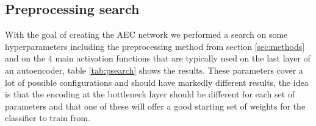     \subsection{Preprocessing search} \label{sec:psearc}

      With the goal of creating the AEC network we performed a search on some hyperparameters
      including the preprocessing method from section \ref{sec:methods} and on the 4 main activation functions
      that are typically used on the last layer of an autoencoder, table \ref{tab:psearch} shows the results.
      These parameters cover a lot of possible configurations and should have markedly different results, the idea
      is that the encoding at the bottleneck layer should be different for each set of parameters and that
      one of these will offer a good starting set of weights for the classifier to train from.

